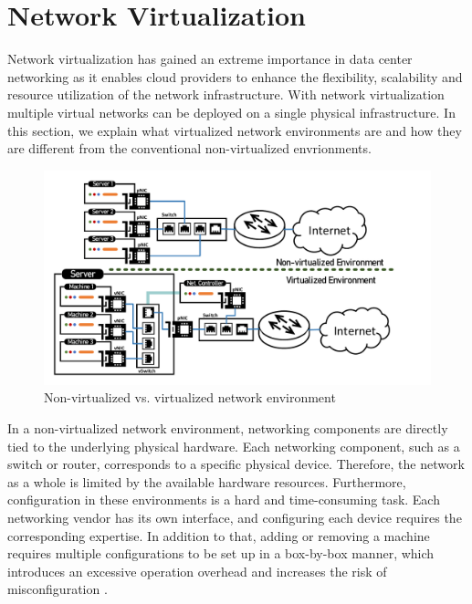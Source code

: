 \section{Network Virtualization}

Network virtualization has gained an extreme importance in data center networking
as it enables cloud providers to enhance the flexibility, scalability 
and resource utilization of the network infrastructure. With network virtualization
multiple virtual networks can be deployed on a single physical infrastructure. In this 
section, we explain what virtualized network environments are and how they are
different from the conventional non-virtualized envrionments.


\begin{figure}
    \centering
    \includegraphics[scale=0.625]{../Figures/non-virt-vs-virt.pdf}
    \caption{Non-virtualized vs. virtualized network environment}
    \label{fig:virt.vs.nonvirt}
\end{figure}



In a non-virtualized network environment, networking components are directly tied 
to the underlying physical hardware. Each networking component, such as a switch or router, 
corresponds to a specific physical device. Therefore, the network as a whole is limited by the 
available hardware resources. Furthermore, configuration in these environments is a hard and 
time-consuming task. Each networking vendor has its own interface, and configuring each 
device requires the corresponding expertise. In addition to that, adding or removing a machine 
requires multiple configurations to be set up in a box-by-box manner, which introduces 
an excessive operation overhead and increases the risk of misconfiguration 
\cite{cearley2013top, marty2019snap}.

